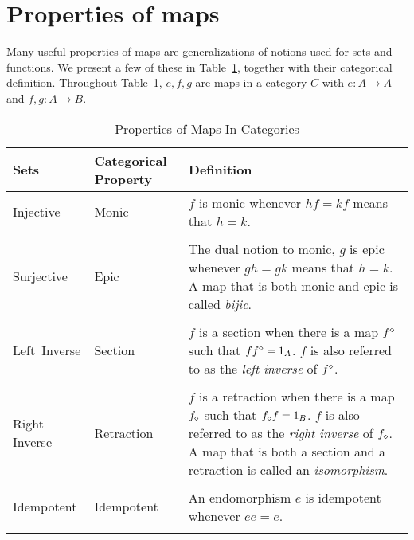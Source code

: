 \section{Properties of maps} %
\label{sub:properties_of_maps}
Many useful properties of maps are generalizations of notions used for sets and functions. We
present a few of these in Table~\ref{tab:properties_of_maps_in_categories}, together with their
categorical definition. Throughout Table~\ref{tab:properties_of_maps_in_categories}, $e,f,g$ are
maps in a category $C$ with $e:A \to A$ and $f,g:A \to B$.
\begin{table}[!htbp]
  \begin{center}
    \begin{tabular}{|p{1in}p{1in}p{3.78in}|}
      \hline
      {\bf Sets} & {\bf Categorical Property} & {\bf Definition}\\
      \hline
      \hline
      Injective & Monic & $f$ is monic whenever $h f = k f$ means that $h = k$.\\
      & & \\
      \hline
      Surjective & Epic & {The dual notion to monic, $g$ is epic whenever $g h = g k$ means that $h = k$.
      A map that is both monic and epic is called \emph{bijic}.}\\
      & & \\
      \hline
      Left~Inverse & Section & $f$ is a section when there is a map ${f}^\diamond$ such that $f {f}^\diamond = 1_A$. $f$
      is also referred to as the \emph{left inverse} of ${f}^\diamond$.\\
      & & \\
      \hline
      Right Inverse & Retraction & $f$ is a retraction when there is a map ${f}_\diamond$ such that ${f}_\diamond f = 1_B$.
      $f$ is also referred to as the \emph{right inverse} of ${f}_\diamond$. A map that is both a section and a
      retraction is called an \emph{isomorphism}.\\
      & & \\
      \hline
      Idempotent & Idempotent & An endomorphism $e$ is idempotent whenever $e e = e$.\\
      & & \\
      \hline
    \end{tabular}
  \end{center}
  \caption{Properties of Maps In Categories}
  \label{tab:properties_of_maps_in_categories}
\end{table}


